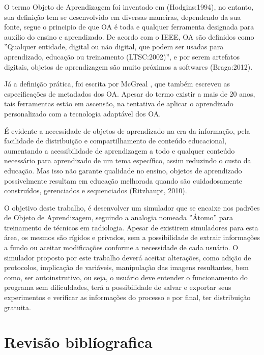 \documentclass[12pt,openright,oneside,a4paper,english,french,spanish,brazil]{unifil}
\begin{document}
O termo Objeto de Aprendizagem foi inventado em (Hodgins:1994), no entanto, sua definição tem se desenvolvido em diversas maneiras, dependendo da sua fonte, segue o principio de que OA é toda e qualquer ferramenta designada para auxílio do ensino e aprendizado. De acordo com o IEEE, OA são definidos como ''Qualquer entidade, digital ou não digital, que podem ser usadas para aprendizado, educação ou treinamento (LTSC:2002)'', e por serem artefatos digitais, objetos de aprendizagem são muito próximos a softwares (Braga:2012).
\par Já a definição prática, foi escrita por McGreal \cite{McGreal:2003}, que também escreveu as especificações de metadados dos OA. Apesar do termo existir a mais de 20 anos, tais ferramentas estão em ascensão, na tentativa de aplicar o aprendizado personalizado com a tecnologia adaptável dos OA.
	
	É evidente a necessidade de objetos de aprendizado na era da informação, pela facilidade de distribuição e compartilhamento de conteúdo educacional, aumentando a acessibilidade de aprendizagem a todo e qualquer conteúdo necessário para aprendizado de um tema específico, assim reduzindo o custo da educação. Mas isso não garante qualidade no ensino, objetos de aprendizado possivelmente resultam em educação melhorada quando são cuidadosamente construídos, gerenciados e sequenciados (Ritzhaupt, 2010).
	
	O objetivo deste trabalho, é desenvolver um simulador que se encaixe nos padrões de Objeto de Aprendizagem, seguindo a analogia nomeada ''Átomo'' para treinamento de técnicos em radiologia. Apesar de existirem simuladores para esta área, os mesmos são rígidos e privados, sem a possibilidade de extrair informações a fundo ou aceitar modificações conforme a necessidade de cada usuário. O simulador proposto por este trabalho deverá aceitar alterações, como adição de protocolos, implicação de variáveis, manipulação das imagens resultantes, bem como, ser autoinstrutivo, ou seja, o usuário deve entender o funcionamento do programa sem dificuldades, terá a possibilidade de salvar e exportar seus experimentos e verificar as informações do processo e por final, ter distribuição gratuita.

\chapter{Revisão biblíografica}%
\end{document}

